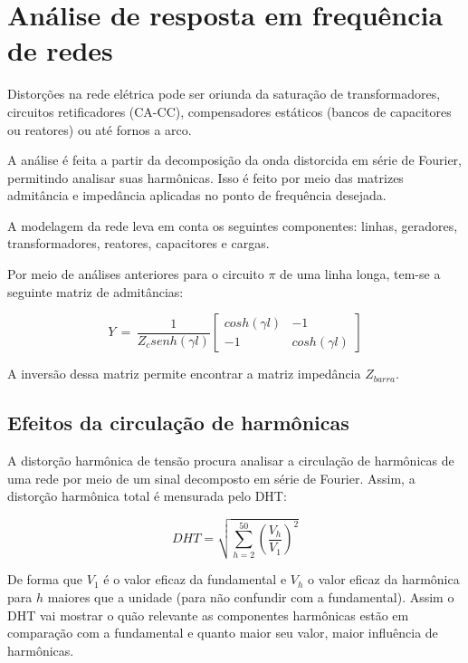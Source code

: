 \section{Análise de resposta em frequência de redes }

Distorções na rede elétrica pode ser oriunda da saturação de transformadores, circuitos retificadores (CA-CC), compensadores estáticos (bancos de capacitores ou reatores) ou até fornos a arco.

A análise é feita a partir da decomposição da onda distorcida em série de Fourier, permitindo analisar suas harmônicas. Isso é feito por meio das matrizes admitância e impedância aplicadas no ponto de frequência desejada.

A modelagem da rede leva em conta os seguintes componentes: linhas, geradores, transformadores, reatores, capacitores e cargas.

Por meio de análises anteriores para o circuito $\pi$ de uma linha longa, tem-se a seguinte matriz de admitâncias:

\begin{equation} \label{slide:4:1}
    Y\, = \,\frac{1}{Z_c senh(\gamma l)}\begin{bmatrix} cosh(\gamma l) & -1 \\ -1 & cosh(\gamma l)   \end{bmatrix}
\end{equation}

A inversão dessa matriz permite encontrar a matriz impedância $Z_{barra}$.

\subsection{Efeitos da circulação de harmônicas}

A distorção harmônica de tensão procura analisar a circulação de harmônicas de uma rede por meio de um sinal decomposto em série de Fourier. Assim, a distorção harmônica total é mensurada pelo DHT:

\begin{equation} \label{slide:4:2}
    DHT = \sqrt{\sum_{h = 2}^{50}  \left(\frac{V_h}{V_1}\right)^2}
\end{equation}

De forma que $V_1$ é o valor eficaz da fundamental e $V_h$ o valor eficaz da harmônica para $h$ maiores que a unidade (para não confundir com a fundamental). Assim o DHT vai mostrar o quão relevante as componentes harmônicas estão em comparação com a fundamental e quanto maior seu valor, maior influência de harmônicas.

